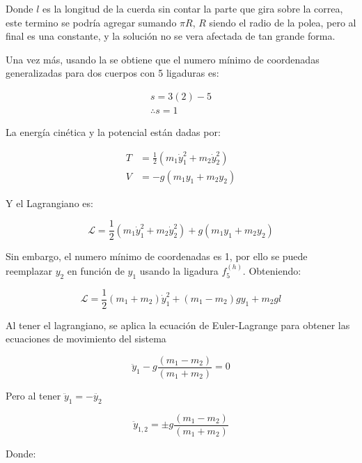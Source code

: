 \documentclass{article}
\theoremstyle{definition}
\begin{document}
Donde $l$ es la longitud de la cuerda sin contar la parte que gira sobre la correa, este termino se podría agregar sumando $\pi R$, $R$ siendo el radio de la polea, pero al final es una constante, y la solución no se vera afectada de tan grande forma.

Una vez más, usando la  se obtiene que el numero mínimo de coordenadas generalizadas para dos cuerpos con 5 ligaduras es:

\begin{gather}
	s = 3(2) - 5 \\
	\therefore s = 1
\end{gather}

La energía cinética y la potencial están dadas por:

\begin{align}
	T &= \frac{1}{2} \left(m_1 \dot{y}_1^2 + m_2 \dot{y}_2^2 \right) \\
	V &= -g \left(m_1 y_1 + m_2 y_2 \right)
\end{align}

Y el Lagrangiano es:

\begin{equation}
	\mathcal{L} = \frac{1}{2} \left(m_1 \dot{y}_1^2 + m_2 \dot{y}_2^2 \right) + g \left(m_1 y_1 + m_2 y_2 \right)
\end{equation}

Sin embargo, el numero mínimo de coordenadas es 1, por ello se puede reemplazar $y_2$ en función de $y_1$ usando la ligadura $f_5^{(h)}$. Obteniendo:

\begin{equation}
	\mathcal{L} = \frac{1}{2} \left(m_1 + m_2 \right) \dot{y}_1^2 + \left(m_1 - m_2 \right)g y_1 + m_2 gl
\end{equation}

Al tener el lagrangiano, se aplica la ecuación de Euler-Lagrange para obtener las ecuaciones de movimiento del sistema

\begin{equation}
	\ddot{y}_1 - g\frac{\left(m_1 - m_2 \right)}{\left(m_1 + m_2\right)} = 0
\end{equation}

Pero al tener $\ddot{y}_1 = -\ddot{y_2}$

\begin{equation}
	\ddot{y}_{1,2} = \pm g \frac{\left(m_1 - m_2 \right)}{\left(m_1 + m_2\right)}
\end{equation}

Donde:
\end{document}
